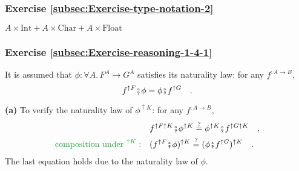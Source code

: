\subsubsection*{Exercise \ref{subsec:Exercise-type-notation-2}}

$A\times\text{Int}+A\times\text{Char}+A\times\text{Float}$

\subsubsection*{Exercise \ref{subsec:Exercise-reasoning-1-4-1}}

It is assumed that $\phi:\forall A.\,F^{A}\rightarrow G^{A}$ satisfies
its naturality law: for any $f^{:A\rightarrow B}$,
\[
f^{\uparrow F}\bef\phi=\phi\bef f^{\uparrow G}\quad.
\]

\textbf{(a)} To verify the naturality law of $\phi^{\uparrow K}$:
for any $f^{:A\rightarrow B}$,
\begin{align*}
 & f^{\uparrow F\uparrow K}\bef\phi^{\uparrow K}\overset{?}{=}\phi^{\uparrow K}\bef f^{\uparrow G\uparrow K}\quad,\\
{\color{greenunder}\text{composition under }^{\uparrow K}:}\quad & (f^{\uparrow F}\bef\phi)^{\uparrow K}\overset{?}{=}(\phi\bef f^{\uparrow G})^{\uparrow K}\quad.
\end{align*}
The last equation holds due to the naturality law of $\phi$.

